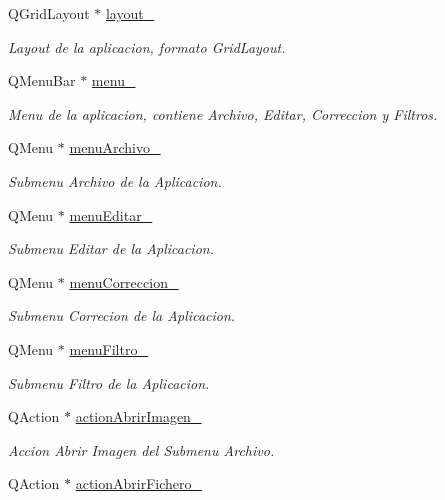 \begin{DoxyCompactItemize}
Q\+Grid\+Layout $\ast$ \hyperlink{classCAplicacion_a135b700bb291de086b00bcc4481ffc8b}{layout\+\_\+}
\begin{DoxyCompactList}\small\item\em Layout de la aplicacion, formato Grid\+Layout. \end{DoxyCompactList}\item 
Q\+Menu\+Bar $\ast$ \hyperlink{classCAplicacion_af1ac43fa5f82c2512f211fc0dbb00a3a}{menu\+\_\+}
\begin{DoxyCompactList}\small\item\em Menu de la aplicacion, contiene Archivo, Editar, Correccion y Filtros. \end{DoxyCompactList}\item 
Q\+Menu $\ast$ \hyperlink{classCAplicacion_abdf7a15d27725756e59d4408267d4688}{menu\+Archivo\+\_\+}
\begin{DoxyCompactList}\small\item\em Submenu Archivo de la Aplicacion. \end{DoxyCompactList}\item 
Q\+Menu $\ast$ \hyperlink{classCAplicacion_a9753ee6650d3a8922650b09b70fe15b9}{menu\+Editar\+\_\+}
\begin{DoxyCompactList}\small\item\em Submenu Editar de la Aplicacion. \end{DoxyCompactList}\item 
Q\+Menu $\ast$ \hyperlink{classCAplicacion_acb53cba72e72d1b6feb8203a4942b436}{menu\+Correccion\+\_\+}
\begin{DoxyCompactList}\small\item\em Submenu Correcion de la Aplicacion. \end{DoxyCompactList}\item 
Q\+Menu $\ast$ \hyperlink{classCAplicacion_af9dedeec60356a055cb899e5f8a447b8}{menu\+Filtro\+\_\+}
\begin{DoxyCompactList}\small\item\em Submenu Filtro de la Aplicacion. \end{DoxyCompactList}\item 
Q\+Action $\ast$ \hyperlink{classCAplicacion_ac7f0a3871355c19d02bf87f36322cee7}{action\+Abrir\+Imagen\+\_\+}
\begin{DoxyCompactList}\small\item\em Accion Abrir Imagen del Submenu Archivo. \end{DoxyCompactList}\item 
Q\+Action $\ast$ \hyperlink{classCAplicacion_a4fa499b5119ad7bcc86f53ace963cbbd}{action\+Abrir\+Fichero\+\_\+}

\end{DoxyCompactItemize}
